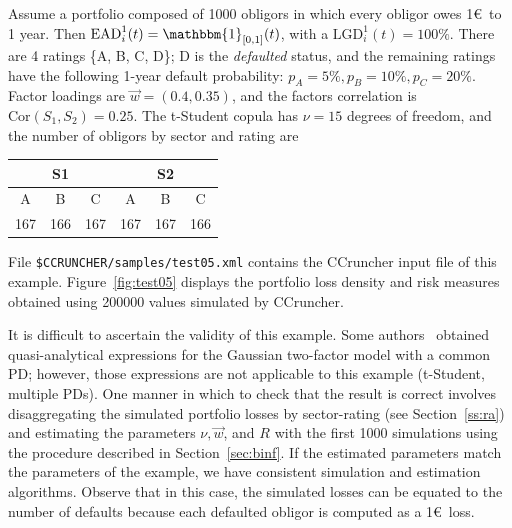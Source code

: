 \documentclass[11pt,fleqn]{book} %
\begin{document}
\begin{example}
	\label{ex:test05}
	Assume a portfolio composed of \num{1000} obligors in which every obligor 
	owes 1\euro\ to 1 year. Then $\text{EAD}_i^1(t) = \mathbbm{1}_{[0,1]}(t)$, 
	with a $\text{LGD}_i^1(t)=100\%$. There are 4 ratings \{A, B, C, D\}; D is 
	the \emph{defaulted} status, and the remaining ratings have the following 
	1-year default probability: $p_A = 5\%, p_B = 10\%, p_C = 20\%$. Factor 
	loadings are $\vec{w} = (0.4, 0.35)$, and the factors correlation is 
	$\text{Cor}(S_1,S_2) = 0.25$. The t-Student copula has $\nu=15$ degrees
	of freedom, and the number of obligors by sector and rating are

	\hspace*{1cm}
	\begin{tabular}{|c|c|c||c|c|c|}
		\hline
		\multicolumn{3}{|c||}{S1} & \multicolumn{3}{|c|}{S2} \\
		\hline
		A & B & C & A & B & C \\
		\hline
		167 & 166 & 167 & 167 & 167 & 166 \\
		\hline
	\end{tabular}

	File \texttt{\$CCRUNCHER/samples/test05.xml} contains the CCruncher input
	file of this example. Figure~\ref{fig:test05} displays the portfolio
	loss density and risk measures obtained using \num{200000} values 
	simulated by CCruncher.

	It is difficult to ascertain the validity of this example. Some 
	authors~\cite{cespedes:2002} obtained quasi-analytical expressions for 
	the Gaussian two-factor model with a common PD; however, those expressions 
	are not applicable to this example (t-Student, multiple PDs). One manner in 
	which to check that the result is correct involves disaggregating the 
	simulated portfolio losses by sector-rating (see Section~\ref{ss:ra}) and 
	estimating the parameters $\nu, \vec{w}$, and $R$ with the first \num{1000} 
	simulations using the procedure described in Section~\ref{sec:binf}. 
	If the estimated parameters match the parameters of the example, we have
	consistent simulation and estimation algorithms. Observe that in 
	this case, the simulated losses can be equated to the number of defaults 
	because each defaulted obligor is computed as a 1\euro\ loss.
\end{example}
\end{document}
